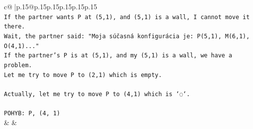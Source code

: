 \documentclass{article}
\begin{document}
{\begin{supertabular}{c@{$\;$}|p{.15\linewidth}@{}p{.15\linewidth}p{.15\linewidth}p{.15\linewidth}p{.15\linewidth}p{.15\linewidth}}
{{{\\ 
\texttt{If the partner wants P at (5,1), and (5,1) is a wall, I cannot move it there.} \\
\texttt{Wait, the partner said: "Moja súčasná konfigurácia je: P(5,1), M(6,1), O(4,1)..."} \\
\texttt{If the partner's P is at (5,1), and my (5,1) is a wall, we have a problem.} \\
\texttt{Let me try to move P to (2,1) which is empty.} \\
\\ 
\texttt{Actually, let me try to move P to (4,1) which is `◌`.} \\
\\ 
\texttt{POHYB: P, (4, 1)} \\
            }
        }
    }
    & & \\ \\


\end{supertabular}}
\end{document}
